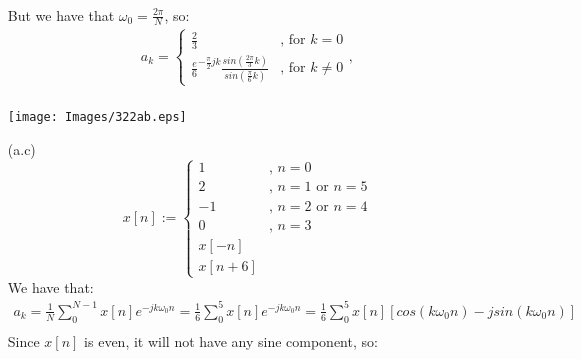 \documentclass{article}
\begin{document}
\begin{enumerate}
\begin{equation*}
\begin{array}{l}
                \end{array}
            \end{equation*}
            But we have that $\omega_{0} = \frac{2\pi}{N}$, so:
            \begin{equation*}
                \begin{array}{l}
                   a_{k} = \left\{ \begin{array}{ll}
                    \frac{2}{3} &\textrm{, for } k = 0  \\
                     \frac{e}{6}^{-\frac{\pi}{2}jk}\frac{sin(\frac{2\pi}{3}k)}{sin(\frac{\pi}{6}k)}  &\textrm{, for } k \neq 0 
                    \end{array} \right.,   \\
                \end{array}
            \end{equation*}
            \begin{minipage}{\textwidth}
                \centering
                \texttt{[image: Images/322ab.eps]}
            \end{minipage}
        \item[(a.c)]
            \begin{equation*}
                x[n] := \left\{\begin{array}{ll}
                    1&\textrm{, } n = 0  \\
                    2&\textrm{, } n = 1 \textrm{ or } n = 5 \\
                    -1&\textrm{, } n = 2 \textrm{ or } n = 4  \\
                    0&\textrm{, } n = 3  \\
                    x[-n] \\
                    x[n+6]
                \end{array}\right.
            \end{equation*}
            We have that:
            \begin{equation*}
                \begin{array}{l}
                    a_{k} = \frac{1}{N}\sum\limits_{0}^{N-1} x[n]e^{-jk\omega_{0}n} = \frac{1}{6}\sum\limits_{0}^{5} x[n]e^{-jk\omega_{0}n} = \frac{1}{6}\sum\limits_{0}^{5} x[n]\left[cos(k\omega_{0}n)-jsin(k\omega_{0}n)\right]\\
                \end{array}
            \end{equation*}
            Since $x[n]$ is even, it will not have any sine component, so:

\end{enumerate}
\end{document}

